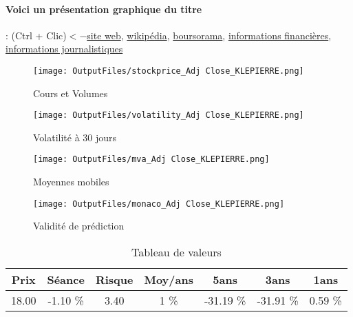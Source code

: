 \documentclass[11pt,a4paper]{report}%
\begin{document}
\paragraph{Voici un présentation graphique du titre} : (Ctrl + Clic)$<-$\href{https://www.klepierre.com/finance/investisseurs}{site web}, \href{https://fr.wikipedia.org/wiki/Kl%C3%A9pierre}{wikipédia}, \href{https://www.boursorama.com/cours/1rPLI}{boursorama}, \href{https://www.qwant.com/?q=site:https:%2f%2fwww.easybourse.com%2faction-societe%2fKLEPIERRE&t=web&client=ext-firefox-hp}{informations financières}, \href{https://bourse.lerevenu.com/cours-de-bourse/fiche-valeur-synthese/KLEPIERRE/LI-FR}{informations journalistiques}
\begin{figure}[!htb]
   \begin{minipage}{0.5\textwidth}
     \centering
     \texttt{[image: OutputFiles/stockprice\_Adj Close\_KLEPIERRE.png]}
     \caption{Cours et Volumes}\label{Fig:price_KLEPIERRE}
   \end{minipage}\hfill
   \begin{minipage}{0.5\textwidth}
     \centering
     \texttt{[image: OutputFiles/volatility\_Adj Close\_KLEPIERRE.png]}
     \caption{Volatilité à 30 jours}\label{Fig:volat_KLEPIERRE}
   \end{minipage}
\end{figure}
\begin{figure}[!htb]
   \begin{minipage}{0.5\textwidth}
     \centering
     \texttt{[image: OutputFiles/mva\_Adj Close\_KLEPIERRE.png]}
     \caption{Moyennes mobiles}\label{Fig:mva_KLEPIERRE}
   \end{minipage}\hfill
   \begin{minipage}{0.5\textwidth}
     \centering
     \texttt{[image: OutputFiles/monaco\_Adj Close\_KLEPIERRE.png]}
     \caption{Validité de prédiction}\label{Fig:prediction_KLEPIERRE}
   \end{minipage}
\end{figure}

\begin{table}[H]
  \centering
    \begin{tabular}{|c|c|c|c|c|c|c|}
    \hline
    Prix & Séance & Risque  & Moy/ans & 5ans & 3ans & 1ans \\
    \hline
    18.00 &    -1.10 \%    & 3.40 & 1 \% & -31.19 \% & -31.91 \% & 0.59 \% \\
    \hline
    \end{tabular}%
        \label{tab:table_KLEPIERRE}%
      \caption{Tableau de valeurs}
\end{table}%
\end{document}
